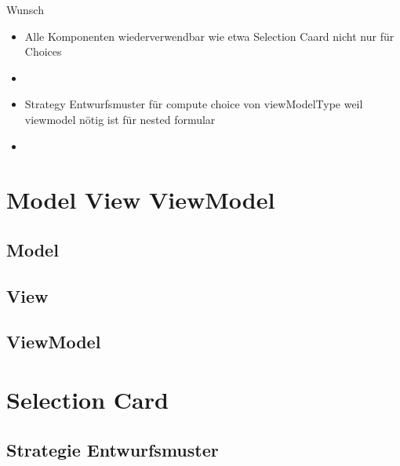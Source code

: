 \documentclass[12pt, twoside]{article}
\begin{document}
 





  



Wunsch
\begin{itemize}
	\item Alle Komponenten wiederverwendbar wie etwa Selection Caard nicht nur für Choices
	\item 
\end{itemize}

\begin{itemize}
	\item Strategy Entwurfsmuster für compute choice von viewModelType weil viewmodel nötig ist für nested formular
	\item 
\end{itemize}

\section{Model View ViewModel}

\subsection{Model}
\subsection{View}
\subsection{ViewModel} 


\section{Selection Card}

\subsection{Strategie Entwurfsmuster}
\end{document}
